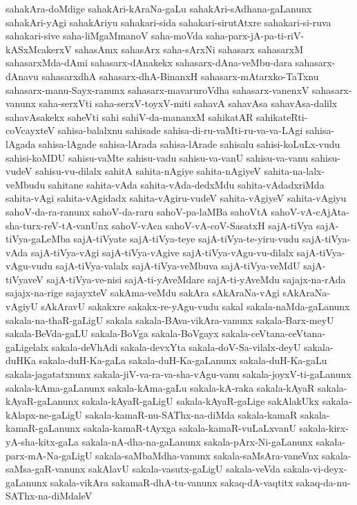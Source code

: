 {sahakAra-doMdige
sahakAri-kAraNa-gaLu
sahakAri-sAdhana-gaLanunx
sahakAri-yAgi
sahakAriyu
sahakari-sida
sahakari-sirutAtxre
sahakari-si-ruva
sahakari-sive
saha-liMgaMmanoV
saha-moVda
saha-parx-jA-pa-ti-riV-kASxMcakerxV
sahasAmx
sahasArx
saha-sArxNi
sahasarx
sahasarxM
sahasarxMda-dAmi
sahasarx-dAnakekx
sahasarx-dAna-veMbu-dara
sahasarx-dAnavu
sahasarxdhA
sahasarx-dhA-BinanxH
sahasarx-mAtarxko-TaTxnu
sahasarx-manu-Sayx-ranunx
sahasarx-mavaruroVdha
sahasarx-vanenxV
sahasarx-vanunx
saha-serxVti
saha-serxV-toyxV-miti
sahavA
sahavAsa
sahavAsa-dalilx
sahavAsakekx
saheVti
sahi
sahiV-da-mananxM
sahikatAR
sahikateRti-coVcayxteV
sahisa-balalxnu
sahisade
sahisa-di-ru-vaMti-ru-va-va-LAgi
sahisa-lAgada
sahisa-lAgade
sahisa-lArada
sahisa-lArade
sahisalu
sahisi-koLuLx-vudu
sahisi-koMDU
sahisu-vaMte
sahisu-vadu
sahisu-va-vanU
sahisu-va-vanu
sahisu-vudeV
sahisu-vu-dilalx
sahitA
sahita-nAgiye
sahita-nAgiyeV
sahita-na-lalx-veMbudu
sahitane
sahita-vAda
sahita-vAda-dedxMdu
sahita-vAdadxriMda
sahita-vAgi
sahita-vAgidadx
sahita-vAgiru-vudeV
sahita-vAgiyeV
sahita-vAgiyu
sahoV-da-ra-ranunx
sahoV-da-raru
sahoV-pa-laMBa
sahoVtA
sahoV-vA-cAjAta-sha-turx-reV-tA-vanUnx
sahoV-vAca
sahoV-vA-coV-SasatxH
sajA-tiVya
sajA-tiVya-gaLeMba
sajA-tiVyate
sajA-tiVya-teye
sajA-tiVya-te-yiru-vudu
sajA-tiVya-vAda
sajA-tiVya-vAgi
sajA-tiVya-vAgive
sajA-tiVya-vAgu-vu-dilalx
sajA-tiVya-vAgu-vudu
sajA-tiVya-valalx
sajA-tiVya-veMbuva
sajA-tiVya-veMdU
sajA-tiVyaveV
sajA-tiVya-ve-nisi
sajA-ti-yAveMdare
sajA-ti-yAveMdu
sajajx-na-rAda
sajajx-na-rige
sajayxteV
sakAma-veMdu
sakAra
sAkAraNa-vAgi
sAkAraNa-vAgiyU
sAkAravU
sakakxre
sakakx-re-yAgu-vudu
sakal
sakala-naMda-gaLanunx
sakala-na-thaR-gaLigU
sakala
sakala-BAva-vikAra-vanunx
sakala-Barx-meyU
sakala-BeVda-gaLU
sakala-BoVga
sakala-BoVgayx
sakala-ceVtana-ceVtana-gaLigelalx
sakala-deVhAdi
sakala-devxYta
sakala-doV-Sa-vilalx-deyU
sakala-duHKa
sakala-duH-Ka-gaLa
sakala-duH-Ka-gaLanunx
sakala-duH-Ka-gaLu
sakala-jagatatxnunx
sakala-jiV-va-ra-va-sha-vAgu-vanu
sakala-joyxV-ti-gaLanunx
sakala-kAma-gaLanunx
sakala-kAma-gaLu
sakala-kA-raka
sakala-kAyaR
sakala-kAyaR-gaLanunx
sakala-kAyaR-gaLigU
sakala-kAyaR-gaLige
sakAlakUkx
sakala-kAlapx-ne-gaLigU
sakala-kamaR-nu-SAThx-na-diMda
sakala-kamaR
sakala-kamaR-gaLanunx
sakala-kamaR-tAyxga
sakala-kamaR-vuLaLxvanU
sakala-kirx-yA-sha-kitx-gaLa
sakala-nA-dha-na-gaLanunx
sakala-pArx-Ni-gaLanunx
sakala-parx-mA-Na-gaLigU
sakala-saMbaMdha-vanunx
sakala-saMsAra-vaneVnx
sakala-saMsa-gaR-vanunx
sakAlavU
sakala-vasutx-gaLigU
sakala-veVda
sakala-vi-deyx-gaLanunx
sakala-vikAra
sakamaR-dhA-tu-vanunx
sakaq-dA-vaqtitx
sakaq-da-nu-SAThx-na-diMdaleV
}
